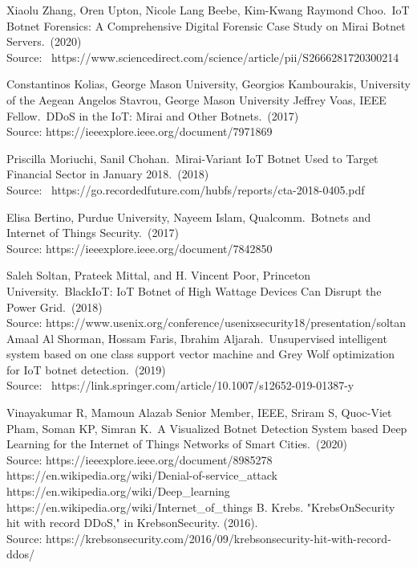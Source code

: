 \documentclass[conference]{IEEEtran}
\begin{document}
\begin{thebibliography}{00}
Xiaolu Zhang, Oren Upton, Nicole Lang Beebe, Kim-Kwang Raymond Choo. IoT Botnet Forensics: A Comprehensive Digital Forensic Case Study on Mirai Botnet Servers. (2020) 
\\Source:  https://www.sciencedirect.com/science/article/pii/S2666281720300214

 Constantinos Kolias, George Mason University, Georgios Kambourakis, University of the Aegean Angelos Stavrou, George Mason University Jeffrey Voas, IEEE Fellow. DDoS in the IoT: Mirai and Other Botnets. (2017) 
\\Source: https://ieeexplore.ieee.org/document/7971869

Priscilla Moriuchi, Sanil Chohan. Mirai-Variant IoT Botnet Used to Target Financial Sector in January 2018. (2018)
\\Source:  https://go.recordedfuture.com/hubfs/reports/cta-2018-0405.pdf

Elisa Bertino, Purdue University, Nayeem Islam, Qualcomm. Botnets and Internet of Things Security. (2017) 
\\Source: https://ieeexplore.ieee.org/document/7842850

Saleh Soltan, Prateek Mittal, and H. Vincent Poor, Princeton University. BlackIoT: IoT Botnet of High Wattage Devices Can Disrupt the Power Grid. (2018) 
\\Source: https://www.usenix.org/conference/usenixsecurity18/presentation/soltan
Amaal Al Shorman, Hossam Faris, Ibrahim Aljarah. Unsupervised intelligent system based on one class support vector machine and Grey Wolf optimization for IoT botnet detection. (2019) 
\\Source:  https://link.springer.com/article/10.1007/s12652-019-01387-y

Vinayakumar R, Mamoun Alazab Senior Member, IEEE, Sriram S, Quoc-Viet Pham, Soman KP, Simran K. A Visualized Botnet Detection System based Deep Learning for the Internet of Things Networks of Smart Cities. (2020) 
\\Source: https://ieeexplore.ieee.org/document/8985278
https://en.wikipedia.org/wiki/Denial-of-service\_attack
https://en.wikipedia.org/wiki/Deep\_learning
https://en.wikipedia.org/wiki/Internet\_of\_things
B. Krebs. "KrebsOnSecurity hit with record
DDoS," in KrebsonSecurity. (2016). \\Source:
https://krebsonsecurity.com/2016/09/krebsonsecurity-hit-with-record-ddos/


\end{thebibliography}
\end{document}
